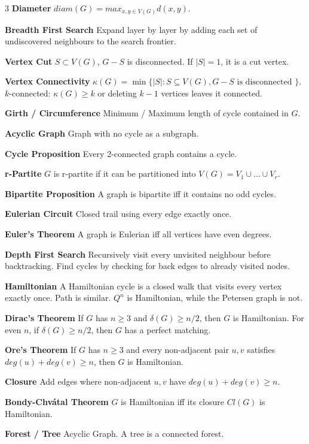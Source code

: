\documentclass[10pt, landscape]{article}
\begin{document}
\begin{multicols*}{3}
\textbf{Diameter} $diam(G)=max_{x,y \in V(G)}d(x,y)$.

\textbf{Breadth First Search} Expand layer by layer by adding each set of undiscovered neighbours to the search frontier.

\textbf{Vertex Cut} $S \subset V(G)$, $G-S$ is disconnected. If $|S|=1$, it is a cut vertex.

\textbf{Vertex Connectivity} $\kappa(G)=\min\{|S|:S \subseteq V(G), G-S\text{ is disconnected }\}$. $k$-connected: $\kappa(G) \geq k$ or deleting $k-1$ vertices leaves it connected.

\textbf{Girth / Circumference} Minimum / Maximum length of cycle contained in $G$.

\textbf{Acyclic Graph} Graph with no cycle as a subgraph.

\textbf{Cycle Proposition} Every 2-connected graph contains a cycle.

\textbf{r-Partite} $G$ is r-partite if it can be partitioned into $V(G)=V_1\cup...\cup V_r$.

\textbf{Bipartite Proposition} A graph is bipartite iff it contains no odd cycles.

\textbf{Eulerian Circuit} Closed trail using every edge exactly once.

\textbf{Euler's Theorem} A graph is Eulerian iff all vertices have even degrees.

\textbf{Depth First Search} Recursively visit every unvisited neighbour before backtracking. Find cycles by checking for back edges to already visited nodes.

\textbf{Hamiltonian} A Hamiltonian cycle is a closed walk that visits every vertex exactly once. Path is similar. $Q^n$ is Hamiltonian, while the Petersen graph is not.

\textbf{Dirac's Theorem} If $G$ has $n \geq 3$ and $\delta(G) \geq n/2$, then $G$ is Hamiltonian. For even $n$, if $\delta(G) \geq n/2$, then $G$ has a perfect matching.

\textbf{Ore's Theorem} If $G$ has $n \geq 3$ and every non-adjacent pair $u,v$ satisfies $deg(u)+deg(v) \geq n$, then $G$ is Hamiltonian.

\textbf{Closure} Add edges where non-adjacent $u,v$ have $deg(u)+deg(v) \geq n$.

\textbf{Bondy-Chvátal Theorem} $G$ is Hamiltonian iff its closure $Cl(G)$ is Hamiltonian.

\textbf{Forest / Tree} Acyclic Graph. A tree is a connected forest.


\end{multicols*}
\end{document}
